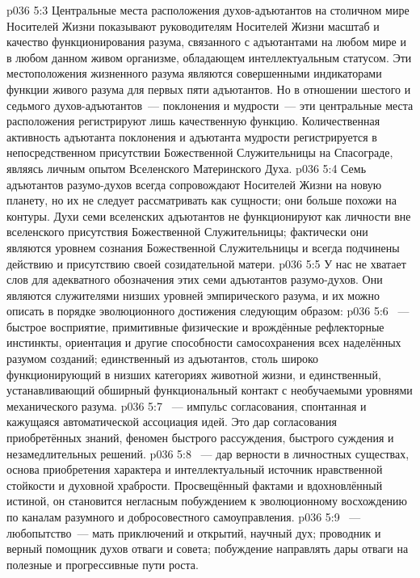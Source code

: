 \vs p036 5:3 Центральные места расположения духов\hyp{}адъютантов на столичном мире Носителей Жизни показывают руководителям Носителей Жизни масштаб и качество функционирования разума, связанного с адъютантами на любом мире и в любом данном живом организме, обладающем интеллектуальным статусом. Эти местоположения жизненного разума являются совершенными индикаторами функции живого разума для первых пяти адъютантов. Но в отношении шестого и седьмого духов\hyp{}адъютантов~--- поклонения и мудрости~--- эти центральные места расположения регистрируют лишь качественную функцию. Количественная активность адъютанта поклонения и адъютанта мудрости регистрируется в непосредственном присутствии Божественной Служительницы на Спасограде, являясь личным опытом Вселенского Материнского Духа.
\vs p036 5:4 \pc Семь адъютантов разумо\hyp{}духов всегда сопровождают Носителей Жизни на новую планету, но их не следует рассматривать как сущности; они больше похожи на контуры. Духи семи вселенских адъютантов не функционируют как личности вне вселенского присутствия Божественной Служительницы; фактически они являются уровнем сознания Божественной Служительницы и всегда подчинены действию и присутствию своей созидательной матери.
\vs p036 5:5 У нас не хватает слов для адекватного обозначения этих семи адъютантов разумо\hyp{}духов. Они являются служителями низших уровней эмпирического разума, и их можно описать в порядке эволюционного достижения следующим образом:
\vs p036 5:6 ~--- быстрое восприятие, примитивные физические и врождённые рефлекторные инстинкты, ориентация и другие способности самосохранения всех наделённых разумом созданий; единственный из адъютантов, столь широко функционирующий в низших категориях животной жизни, и единственный, устанавливающий обширный функциональный контакт с необучаемыми уровнями механического разума.
\vs p036 5:7 ~--- импульс согласования, спонтанная и кажущаяся автоматической ассоциация идей. Это дар согласования приобретённых знаний, феномен быстрого рассуждения, быстрого суждения и незамедлительных решений.
\vs p036 5:8 ~--- дар верности в личностных существах, основа приобретения характера и интеллектуальный источник нравственной стойкости и духовной храбрости. Просвещённый фактами и вдохновлённый истиной, он становится негласным побуждением к эволюционному восхождению по каналам разумного и добросовестного самоуправления.
\vs p036 5:9 ~--- любопытство~--- мать приключений и открытий, научный дух; проводник и верный помощник духов отваги и совета; побуждение направлять дары отваги на полезные и прогрессивные пути роста.
